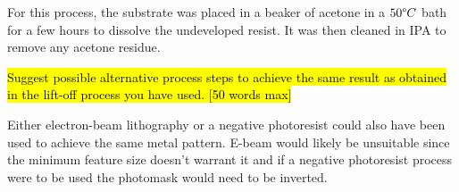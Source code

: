 For this process, the substrate was placed in a beaker of acetone in a $50\degree C$ bath for a few hours to dissolve the undeveloped resist. It was then cleaned in IPA to remove any acetone residue.

\hl{Suggest possible alternative process steps to achieve the same result as obtained in the lift-off process you have used. [50 words max]}

Either electron-beam lithography or a negative photoresist could also have been used to achieve the same metal pattern. E-beam would likely be unsuitable since the minimum feature size doesn't warrant it and if a negative photoresist process were to be used the photomask would need to be inverted.
